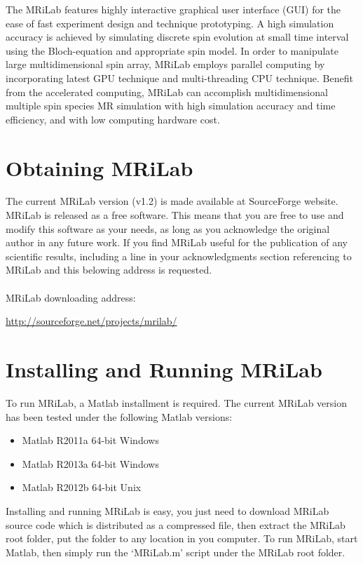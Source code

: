 \documentclass{book}%
\begin{document}
The MRiLab features highly interactive graphical user interface (GUI) for the ease of fast experiment design and technique prototyping. A high simulation accuracy is achieved by simulating discrete spin evolution at small time interval using the Bloch-equation and appropriate spin model. In order to manipulate large multidimensional spin array, MRiLab employs parallel computing by incorporating latest GPU technique and multi-threading CPU technique. Benefit from the accelerated computing, MRiLab can accomplish multidimensional multiple spin species MR simulation with high simulation accuracy and time efficiency, and with low computing hardware cost. 

\section{Obtaining MRiLab}
The current MRiLab version (v1.2) is made available at SourceForge website. MRiLab is released as a free software. This means that you are free to use and modify this software as your needs, as long as you acknowledge the original author in any future work. If you find MRiLab useful for the publication of any scientific results, including a line in your acknowledgments section referencing to MRiLab and this belowing address is requested.\\
\\
MRiLab downloading address:
\begin{center}
\url{http://sourceforge.net/projects/mrilab/}
\end{center}

\section{Installing and Running MRiLab}

To run MRiLab, a Matlab installment is required. The current MRiLab version has been tested under the following Matlab versions:
\begin{itemize}
\item Matlab R2011a 64-bit Windows
\item Matlab R2013a 64-bit Windows
\item Matlab R2012b 64-bit Unix
\end{itemize}

Installing and running MRiLab is easy, you just need to download MRiLab source code which is distributed as a compressed file, then extract the MRiLab root folder, put the folder to any location in you computer. To run MRiLab, start Matlab, then simply run the `MRiLab.m' script under the MRiLab root folder. \\
\end{document}

